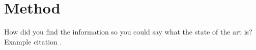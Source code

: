 \newpage
\section{Method}
How did you find the information so you could say what the state of the art is?
Example citation \cite{example}.
